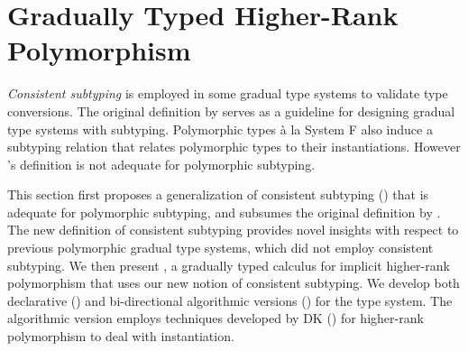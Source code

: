 \chapter{Gradually Typed Higher-Rank Polymorphism}
\label{chap:Gradual}

\textit{Consistent subtyping} is employed in some gradual type systems to validate type
conversions. The original definition by \citet{siek2007gradual} serves as
a guideline for designing gradual type systems with subtyping. Polymorphic
types \`a la System F also induce a subtyping relation that relates
polymorphic types to their instantiations. However
\citeauthor{siek2007gradual}'s definition is not adequate for polymorphic
subtyping.

This section first proposes a generalization of consistent subtyping
() that is adequate for polymorphic subtyping, and
subsumes the original definition by \citeauthor{siek2007gradual}. The new
definition of consistent subtyping provides novel insights with respect to
previous polymorphic gradual type systems, which did not employ consistent
subtyping. We then present \gpc, a gradually typed calculus for implicit
higher-rank polymorphism that uses our new notion of consistent subtyping. We
develop both declarative () and bi-directional
algorithmic versions () for the type system. The
algorithmic version employs techniques developed by DK () for
higher-rank polymorphism to deal with instantiation.








